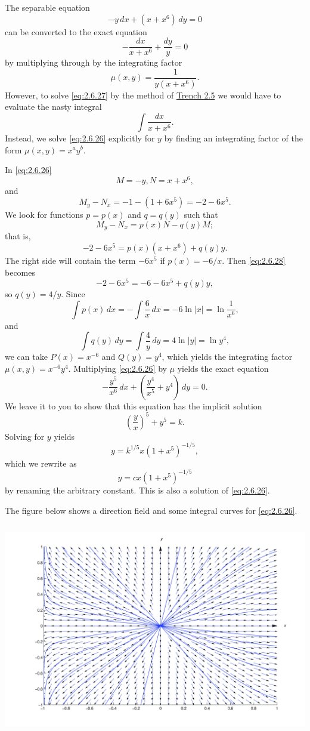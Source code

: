\documentclass{ximera}
\begin{document}
\begin{example}\label{example:2.6.4}
The separable  equation
\begin{equation}\label{eq:2.6.26}
-y\,dx+(x+x^6)\,dy=0
\end{equation}
can be converted to the exact equation
\begin{equation} \label{eq:2.6.27}
-\frac{dx}{x+x^6}+\frac{dy}{y}=0
\end{equation}
by multiplying through
by the  integrating factor
$$
\mu(x,y)=\frac{1}{y(x+x^6)}.
$$
However, to solve \eqref{eq:2.6.27} by the method of \href{https://ximera.osu.edu/ode/main/exactEquations/exactEquations}{Trench 2.5}
we would have to evaluate the nasty integral
$$
\int \frac{dx}{x+x^6}.
$$
Instead, we solve \eqref{eq:2.6.26} explicitly for $y$ by finding  an
integrating factor of the form
$\mu(x,y)=x^ay^b$.

In \eqref{eq:2.6.26}
$$
M=-y, N=x+x^6,
$$
and
$$
M_y-N_x=-1-(1+6x^5)=-2-6x^5.
$$
We  look for functions
$p=p(x)$ and $q=q(y)$ such that
$$
M_y-N_x=p(x)N-q(y)M;
$$
that is,
\begin{equation}\label{eq:2.6.28}
-2-6x^5=p(x)(x+x^6)+q(y)y.
\end{equation}
The right side will contain the term $-6x^5$ if $p(x)=-6/x$.   Then
\eqref{eq:2.6.28} becomes
$$
-2-6x^5=-6-6x^5+q(y)y,
$$
so  $q(y)=4/y$.  Since
$$
\int p(x)\,dx=-\int\frac{6}{x}\,dx=-6\ln|x|=\ln\frac{1}{x^6},
$$
 and
$$
\int q(y)\,dy=\int\frac{4}{y}\,dy=4\ln
|y|=\ln{y^4},
$$
we can take $P(x)=x^{-6}$ and $Q(y)=y^4$,
which yields the integrating factor $\mu(x,y)=x^{-6}y^4$.
Multiplying \eqref{eq:2.6.26} by  $\mu$ yields the exact equation
$$
-\frac{y^5}{x^6}\,dx+\left(\frac{y^4}{x^5}+y^4\right)
\,dy=0.
$$
 We leave it to you to 
show that this equation has the implicit solution 
$$
\left(\frac{y}{x}\right)^5+y^5=k.
$$
 Solving for $y$ yields
$$
y=k^{1/5}x(1+x^5)^{-1/5},
$$
which we rewrite as
$$
y=cx(1+x^5)^{-1/5}
$$
by renaming the arbitrary constant.
 This is also a solution of \eqref{eq:2.6.26}.

The figure below shows a direction field and some integral curves
 for \eqref{eq:2.6.26}.
 
 \begin{image}
\includegraphics[height=3.66in]{fig020604.jpg}
\end{image}

\end{example}
\end{document}

